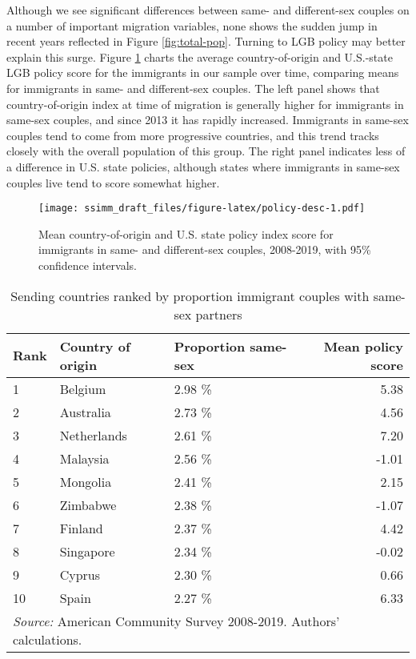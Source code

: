 \documentclass[
  11pt,
]{article}
\begin{document}
Although we see significant differences between same- and different-sex couples on a number of important migration variables, none shows the sudden jump in recent years reflected in Figure \ref{fig:total-pop}. Turning to LGB policy may better explain this surge. Figure \ref{fig:policy-desc} charts the average country-of-origin and U.S.-state LGB policy score for the immigrants in our sample over time, comparing means for immigrants in same- and different-sex couples. The left panel shows that country-of-origin index at time of migration is generally higher for immigrants in same-sex couples, and since 2013 it has rapidly increased. Immigrants in same-sex couples tend to come from more progressive countries, and this trend tracks closely with the overall population of this group. The right panel indicates less of a difference in U.S. state policies, although states where immigrants in same-sex couples live tend to score somewhat higher.

\begin{figure}
\centering
\texttt{[image: ssimm\_draft\_files/figure-latex/policy-desc-1.pdf]}
\caption{\label{fig:policy-desc}Mean country-of-origin and U.S. state policy index score for immigrants in same- and different-sex couples, 2008-2019, with 95\% confidence intervals.}
\end{figure}

\begin{table}

\caption{\label{tab:country-tab}Sending countries ranked by proportion immigrant couples with same-sex partners}
\centering
\begin{tabular}[t]{lllr}
\toprule
Rank & Country of origin & Proportion same-sex & Mean policy score\\
\midrule
1 & Belgium & 2.98 \% & 5.38\\
2 & Australia & 2.73 \% & 4.56\\
3 & Netherlands & 2.61 \% & 7.20\\
4 & Malaysia & 2.56 \% & -1.01\\
5 & Mongolia & 2.41 \% & 2.15\\
6 & Zimbabwe & 2.38 \% & -1.07\\
7 & Finland & 2.37 \% & 4.42\\
8 & Singapore & 2.34 \% & -0.02\\
9 & Cyprus & 2.30 \% & 0.66\\
10 & Spain & 2.27 \% & 6.33\\
\bottomrule
\multicolumn{4}{l}{\rule{0pt}{1em}\textit{Source:} American Community Survey 2008-2019. Authors' calculations.}\\
\end{tabular}
\end{table}
\end{document}
